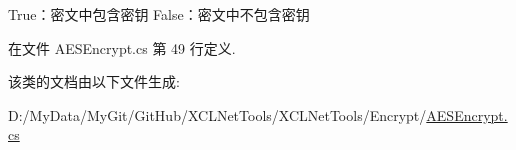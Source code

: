True：密文中包含密钥 False：密文中不包含密钥 



在文件 A\-E\-S\-Encrypt.\-cs 第 49 行定义.



该类的文档由以下文件生成\-:\begin{DoxyCompactItemize}
\item 
D\-:/\-My\-Data/\-My\-Git/\-Git\-Hub/\-X\-C\-L\-Net\-Tools/\-X\-C\-L\-Net\-Tools/\-Encrypt/\hyperlink{_a_e_s_encrypt_8cs}{A\-E\-S\-Encrypt.\-cs}\end{DoxyCompactItemize}
